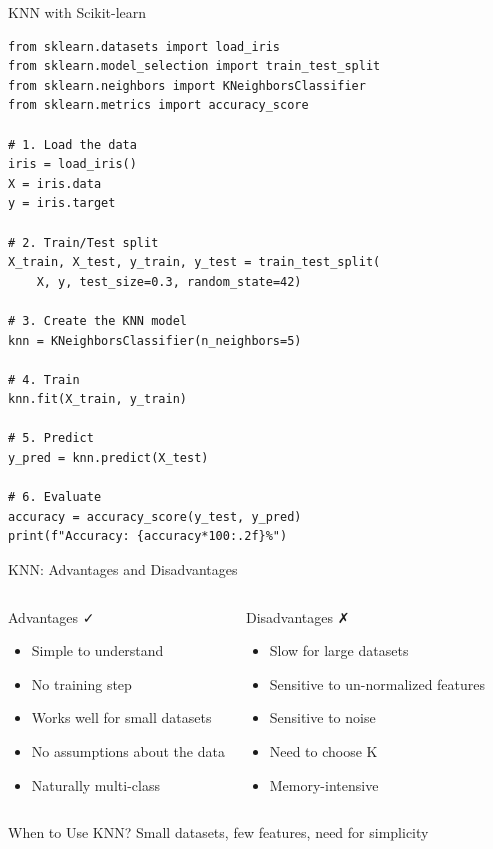 \documentclass[aspectratio=169]{beamer}
\begin{document}
\begin{frame}[fragile]{KNN with Scikit-learn}
\begin{lstlisting}
from sklearn.datasets import load_iris
from sklearn.model_selection import train_test_split
from sklearn.neighbors import KNeighborsClassifier
from sklearn.metrics import accuracy_score

# 1. Load the data
iris = load_iris()
X = iris.data
y = iris.target

# 2. Train/Test split
X_train, X_test, y_train, y_test = train_test_split(
    X, y, test_size=0.3, random_state=42)

# 3. Create the KNN model
knn = KNeighborsClassifier(n_neighbors=5)

# 4. Train
knn.fit(X_train, y_train)

# 5. Predict
y_pred = knn.predict(X_test)

# 6. Evaluate
accuracy = accuracy_score(y_test, y_pred)
print(f"Accuracy: {accuracy*100:.2f}%")
\end{lstlisting}
\end{frame}

\begin{frame}{KNN: Advantages and Disadvantages}
\begin{columns}[T]
\begin{block}{Advantages ✓}
\begin{itemize}
    \item Simple to understand
    \item No training step
    \item Works well for small datasets
    \item No assumptions about the data
    \item Naturally multi-class
\end{itemize}
\end{block}

\begin{block}{Disadvantages ✗}
\begin{itemize}
    \item Slow for large datasets
    \item Sensitive to un-normalized features
    \item Sensitive to noise
    \item Need to choose K
    \item Memory-intensive
\end{itemize}
\end{block}
\end{columns}

\vspace{0.5cm}
\begin{alertblock}{When to Use KNN?}
Small datasets, few features, need for simplicity
\end{alertblock}
\end{frame}
\end{document}
